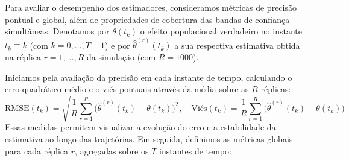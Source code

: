 Para avaliar o desempenho dos estimadores, consideramos métricas de precisão pontual e global, além de propriedades de cobertura das bandas de confiança simultâneas. 
Denotamos por \(\theta(t_k)\) o efeito populacional verdadeiro no instante \(t_k \equiv k\) (com \(k = 0, \dots, T-1\)) e por \(\hat{\theta}^{(r)}(t_k)\) a sua respectiva estimativa obtida na réplica \(r = 1, \dots, R\) da simulação (com \(R = 1000\)).

Iniciamos pela avaliação da precisão em cada instante de tempo, calculando o erro quadrático médio e o viés pontuais através da média sobre as \(R\) réplicas:
\begin{equation}
	\mathrm{RMSE}(t_k) = \sqrt{\frac{1}{R}\sum_{r=1}^{R} \bigl(\hat{\theta}^{(r)}(t_k) - \theta(t_k)\bigr)^2}, \quad \text{Viés}(t_k) = \frac{1}{R}\sum_{r=1}^{R} \bigl(\hat{\theta}^{(r)}(t_k) - \theta(t_k)\bigr)
\end{equation}
Essas medidas permitem visualizar a evolução do erro e a estabilidade da estimativa ao longo das trajetórias. 
Em seguida, definimos as métricas globais para cada réplica \(r\), agregadas sobre os \(T\) instantes de tempo:
